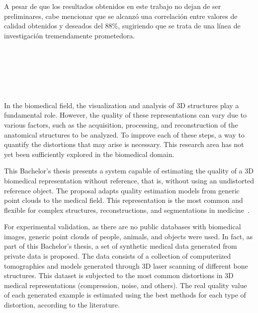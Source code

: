 A pesar de que los resultados obtenidos en este trabajo no dejan de ser preliminares, 
cabe mencionar que se alcanzó una correlación entre valores de calidad obtenidos y 
deseados del 88\%, sugiriendo que se trata de una línea de investigación tremendamente 
prometedora. 

\cleardoublepage


\thispagestyle{empty}


\begin{center}
{\large\bfseries \myTitleENG}\\
\end{center}
\begin{center}
\myName \\
\end{center}

\\

\\

In the biomedical field, the visualization and analysis of 3D structures play a 
fundamental role. However, the quality of these representations can vary due to 
various factors, such as the acquisition, processing, and reconstruction of the 
anatomical structures to be analyzed. To improve each of these steps, a way to 
quantify the distortions that may arise is necessary. 
This research area has not yet been sufficiently explored in the biomedical domain.
\smallskip

This Bachelor's thesis presents a system capable of estimating the quality of a 
3D biomedical representation without reference, that is, without using an 
undistorted reference object. The proposal adapts quality estimation models from 
generic point clouds to the medical field. 
This representation is the most common and flexible for complex structures, 
reconstructions, and segmentations in medicine~\cite{WhyUsePointCloud}.
\smallskip

For experimental validation, as there are no public databases with biomedical images, 
generic point clouds of people, animals, and objects were used. 
In fact, as part of this Bachelor's thesis, a set of synthetic medical data generated 
from private data is proposed. The data consists of a collection 
of computerized tomographies and models generated through 3D laser scanning 
of different bone structures. This dataset is subjected to the most common 
distortions in 3D medical representations (compression, noise, and others). 
The real quality value of each generated example is estimated using the best methods for 
each type of distortion, according to the literature.
\smallskip


